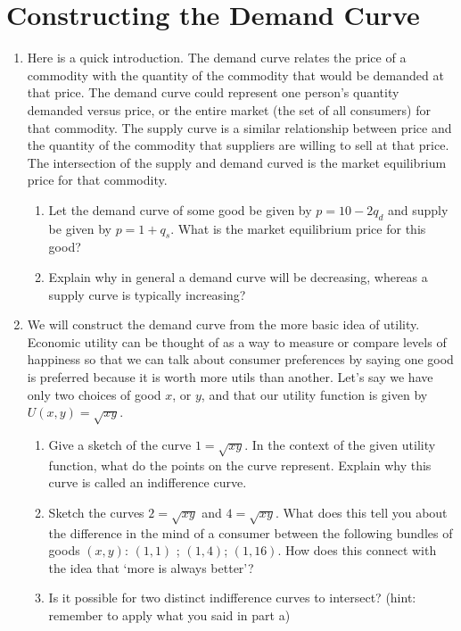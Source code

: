 \documentclass{amsbook}
\begin{document}
\newpage	    
    \section*{Constructing the Demand Curve}

\begin{enumerate}
	\item Here is a quick introduction. The demand curve relates the price of a commodity with the quantity of the commodity that would be demanded at that price. The demand curve could represent one person's quantity demanded versus price, or the entire market (the set of all consumers) for that commodity. The supply curve is a similar relationship between price and the quantity of the commodity that suppliers are willing to sell at that price. The intersection of the supply and demand curved is the market equilibrium price for that commodity.
		\begin{enumerate}
			\item Let the demand curve of some good be given by $p=10-2q_d$ and supply be given by $p=1+q_s$. What is the market equilibrium price for this good?
			\item Explain why in general a demand curve will be decreasing, whereas a supply curve is typically increasing?
		\end{enumerate}
	\item We will construct the demand curve from the more basic idea of utility. Economic utility can be thought of as a way to measure or compare levels of happiness so that we can talk about consumer preferences by saying one good is preferred because it is worth more utils than another. Let's say we have only two choices of good $x$, or $y$, and that our utility function is given by $U(x,y)=\sqrt{xy}$.
		\begin{enumerate}
			\item Give a sketch of the curve $1=\sqrt{xy}$. In the context of the given utility function, what do the points on the curve represent. Explain why this curve is called an indifference curve.
			\item Sketch the curves $2=\sqrt{xy}$ and $4=\sqrt{xy}$. What does this tell you about the difference in the mind of a consumer between the following bundles of goods $(x,y)$: $(1,1)$ ; $(1,4)$; $(1,16)$. How does this connect with the idea that `more is always better'?
			\item Is it possible for two distinct indifference curves to intersect? (hint: remember to apply what you said in part a)
			

\end{enumerate}
\end{enumerate}
\end{document}
